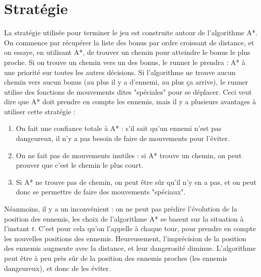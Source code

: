 \chapter{Stratégie}
\label{cp:strategie}

La stratégie utilisée pour terminer le jeu est construite autour de l'algorithme A*.
\newline
On commence par récupérer la liste des bonus par ordre croissant de distance, et on essaye, en utilisant A*, de trouver un chemin pour atteindre le bonus le plus proche.
\newline
Si on trouve un chemin vers un des bonus, le runner le prendra : A* à une priorité sur toutes les autres décisions.
\newline
Si l'algorithme ne trouve aucun chemin vers aucun bonus (au plus il y a d'ennemi, au plus ça arrive), le runner utilise des fonctions de mouvements dites "spéciales" pour se déplacer.
\newline\newline
Ceci veut dire que A* doit prendre en compte les ennemis, mais il y a plusieurs avantages à utiliser cette stratégie :

\begin{enumerate}
    \item On fait une confiance totale à A* : s'il sait qu'un ennemi n'est pas dangeureux, il n'y a pas besoin de faire de mouvements pour l'éviter.
    \item On ne fait pas de mouvements inutiles : si A* trouve un chemin, on peut prouver que c'est le chemin le plus court.
    \item Si A* ne trouve pas de chemin, on peut être sûr qu'il n'y en a pas, et on peut donc se permettre de faire des mouvements "spéciaux".
\end{enumerate}
Néanmoins, il y a un inconvénient : on ne peut pas prédire l'évolution de la position des ennemis, les choix de l'algorithme A* se basent sur la situation à l'instant $t$.
C'est pour cela qu'on l'appelle à chaque tour, pour prendre en compte les nouvelles positions des ennemis.
\newline\newline
Heureusement, l'imprécision de la position des ennemis augmente avec la distance, et leur dangerosité diminue.
L'algorithme peut être à peu près sûr de la position des ennemis proches (les ennemis dangeureux), et donc de les éviter.

\newpage

